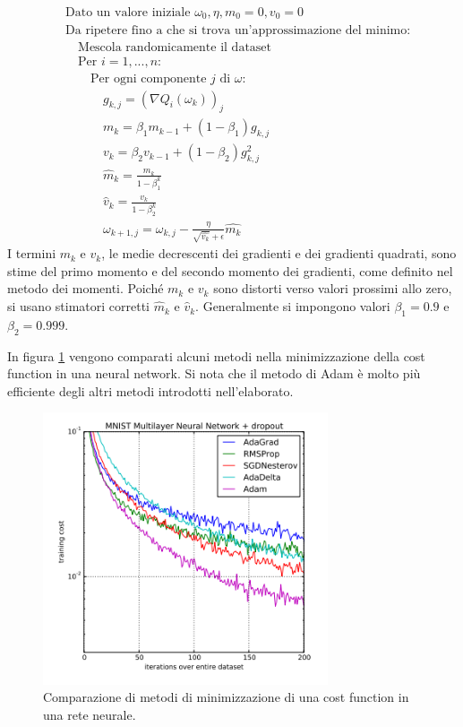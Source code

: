 \begin{align*}
    &\text{Dato un valore iniziale }\omega_0, \eta, m_0=0, v_0=0\\
    &\text{Da ripetere fino a che si trova un'approssimazione del minimo:}\\
    &\quad\text{Mescola randomicamente il dataset}\\
    &\quad\text{Per }i=1,...,n:\\
    &\quad\quad \text{Per ogni componente $j$ di $\omega$:}\\
    &\quad\quad\quad g_{k,j}=(\nabla Q_i(\omega_k))_j\\
    &\quad\quad\quad m_k=\beta_1m_{k-1}+(1-\beta_1)g_{k,j}\\
    &\quad\quad\quad v_k=\beta_2v_{k-1}+(1-\beta_2)g^2_{k,j}\\
    &\quad\quad\quad \hat{m}_k = \frac{m_k}{1-\beta_1^k}\\
    &\quad\quad\quad \hat{v}_k = \frac{v_k}{1-\beta_2^k}\\
    &\quad\quad\quad\omega_{k+1,j}=\omega_{k,j} - \frac{\eta}{\sqrt{\hat{v_k}}+\epsilon}\hat{m_k}
\end{align*}
I termini $m_k$ e $v_k$, le medie decrescenti dei gradienti e dei gradienti quadrati, sono stime del primo momento e del secondo momento dei gradienti, come definito nel metodo dei momenti. Poiché  $m_k$ e $v_k$ sono distorti verso valori prossimi allo zero, si usano stimatori corretti $\hat{m}_k$ e $\hat{v}_k$. Generalmente si impongono valori $\beta_1=0.9$ e $\beta_2=0.999$.

\newpage
In figura \ref{comparison} vengono comparati alcuni metodi nella minimizzazione della cost function in una neural network. Si nota che il metodo di Adam è molto più efficiente degli altri metodi introdotti nell'elaborato.
\begin{figure}[h]
    \centering
    \includegraphics[width=0.75\textwidth]{images/Machine learning/Comparison.PNG}
    \caption{Comparazione di metodi di minimizzazione di una cost function in una rete neurale. \cite{kingma_adam_2017}}
    \label{comparison}
\end{figure}